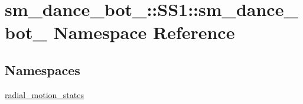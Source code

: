 \hypertarget{namespacesm__dance__bot__3_1_1SS1_1_1sm__dance__bot__3}{}\section{sm\+\_\+dance\+\_\+bot\+\_\+:\+:S\+S1\+:\+:sm\+\_\+dance\+\_\+bot\+\_ Namespace Reference}
\label{namespacesm__dance__bot__3_1_1SS1_1_1sm__dance__bot__3}
\subsection*{Namespaces}
\begin{DoxyCompactItemize}
\item 
 \hyperlink{namespacesm__dance__bot__3_1_1SS1_1_1sm__dance__bot__3_1_1radial__motion__states}{radial\+\_\+motion\+\_\+states}
\end{DoxyCompactItemize}
